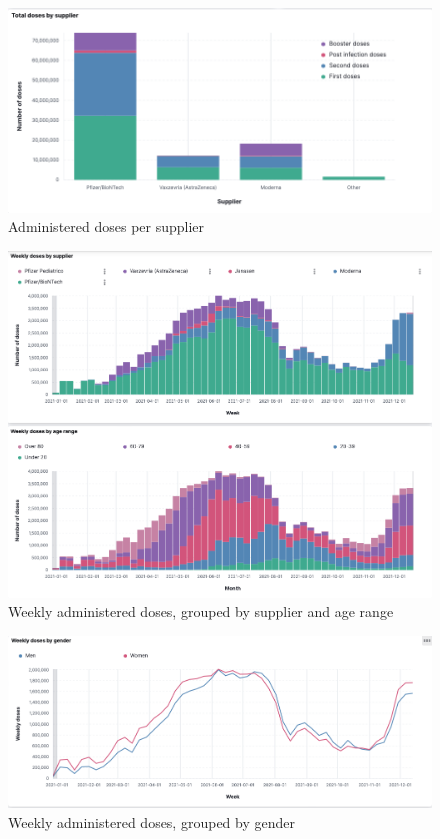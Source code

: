 \documentclass{article}
\begin{document}
    \begin{figure}
        \centering
        \includegraphics[scale=0.3]{ir databases/screenshots/adm_supplier.png}
        \caption{Administered doses per supplier}
        \label{fig:adm_supplier}
    \end{figure}
    \begin{figure}
        \centering
        \includegraphics[scale=0.3]{ir databases/screenshots/adm_weekly1.png}
        \caption{Weekly administered doses, grouped by supplier and age range}
        \label{fig:adm_weekly1}
    \end{figure}
    \begin{figure}
        \centering
        \includegraphics[scale=0.3]{ir databases/screenshots/adm_weekly2.png}
        \caption{Weekly administered doses, grouped by gender}
        \label{fig:adm_weekly2}
    \end{figure}
\end{document}
